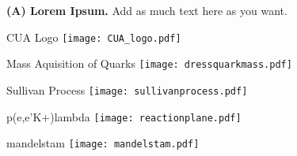 
{\textbf{(A) Lorem Ipsum.} Add as much text here as you want.}

\begin{Mfigure}{CUA Logo}
 \centering
 \texttt{[image: CUA\_logo.pdf]}
\label{fig:titlepagelogo}
\end{Mfigure}

%
%

\begin{Mfigure}{Mass Aquisition of Quarks}
  \centering
  \texttt{[image: dressquarkmass.pdf]}
  \caption{The dressed-quark mass function, M(p), versus momentum which shows the rapid aquisition of mass via the gluon cloud as a result of DCSB. The DSE results are the solid curves and the pseudodata points are produced from numerical simulations of lattice-regularized QCD. [\cite{roberts_hadron_2015}]}
  \label{fig:1-1_dressquarkmass}
\end{Mfigure}

\begin{Mfigure}{Sullivan Process}
  \centering
  \texttt{[image: sullivanprocess.pdf]}
  \caption{Diagram showing the Sullivan Process for acessing a meson's (a) elastic form factor and (b) parton distribution functions (PDFs).}
  \label{fig:1-1_sullivanprocess}
\end{Mfigure}

\begin{Mfigure}{p(e,e'K+)lambda}
  \centering
  \texttt{[image: reactionplane.pdf]}
  \caption{Diagram of reaction and scattering planes for $p(e,e'K^2)\Lambda$ reaction.}
  \label{fig:1-1_reactionplane}
\end{Mfigure}

\begin{Mfigure}{mandelstam}
  \centering
  \texttt{[image: mandelstam.pdf]}
  \caption{Diagram comparing the different Mandelstam channels. [\cite{pannunzio_carmignotto_exploring_2017}]}
  \label{fig:1-1_mandelstam}
\end{Mfigure}

